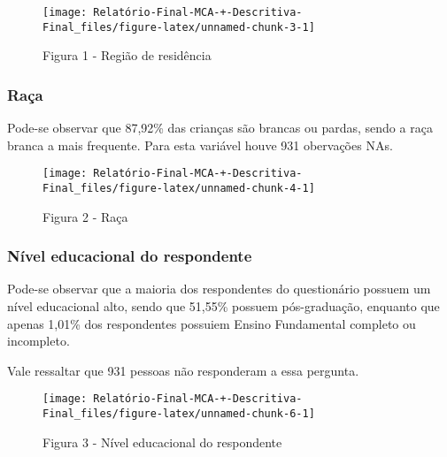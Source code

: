 \documentclass[
]{article}
\begin{document}
\begin{figure}

{\centering \texttt{[image: Relatório-Final-MCA-+-Descritiva-Final\_files/figure-latex/unnamed-chunk-3-1]} 

}

\caption{Figura 1 - Região de residência}\label{fig:unnamed-chunk-3}
\end{figure}

\hypertarget{rauxe7a}{%
\subsubsection{\texorpdfstring{\textbf{Raça}}{Raça}}\label{rauxe7a}}

Pode-se observar que 87,92\% das crianças são brancas ou pardas, sendo a
raça branca a mais frequente. Para esta variável houve 931 obervações
NAs.

\begin{figure}

{\centering \texttt{[image: Relatório-Final-MCA-+-Descritiva-Final\_files/figure-latex/unnamed-chunk-4-1]} 

}

\caption{Figura 2 - Raça}\label{fig:unnamed-chunk-4}
\end{figure}

\hypertarget{nuxedvel-educacional-do-respondente}{%
\subsubsection{\texorpdfstring{\textbf{Nível educacional do
respondente}}{Nível educacional do respondente}}\label{nuxedvel-educacional-do-respondente}}

Pode-se observar que a maioria dos respondentes do questionário possuem
um nível educacional alto, sendo que 51,55\% possuem pós-graduação,
enquanto que apenas 1,01\% dos respondentes possuiem Ensino Fundamental
completo ou incompleto.

Vale ressaltar que 931 pessoas não responderam a essa pergunta.

\begin{figure}

{\centering \texttt{[image: Relatório-Final-MCA-+-Descritiva-Final\_files/figure-latex/unnamed-chunk-6-1]} 

}

\caption{Figura 3 - Nível educacional do respondente}\label{fig:unnamed-chunk-6}
\end{figure}
\end{document}
